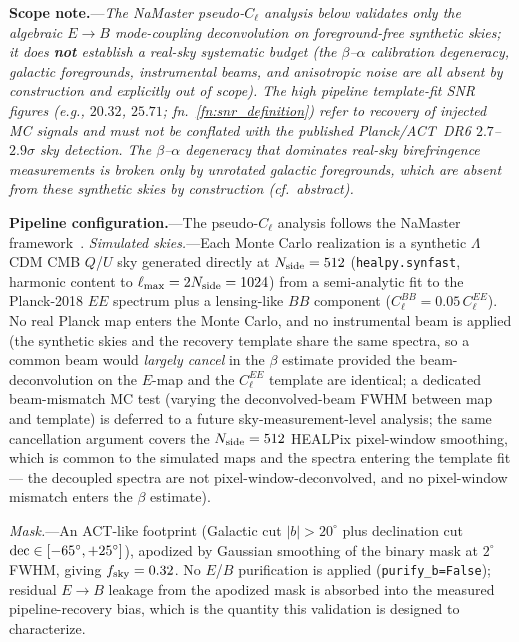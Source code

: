 \documentclass[aps,prd,twocolumn,superscriptaddress,showpacs,preprintnumbers,nofootinbib,longbibliography,floatfix]{revtex4-2}
\begin{document}
\noindent\textbf{Scope note.}---\emph{The NaMaster pseudo-$C_\ell$ analysis
below validates only the algebraic $E\!\to\!B$ mode-coupling deconvolution on
foreground-free synthetic skies; it does \textbf{not} establish a real-sky
systematic budget (the $\beta$--$\alpha$ calibration degeneracy, galactic
foregrounds, instrumental beams, and anisotropic noise are all absent by
construction and explicitly out of scope).
The high pipeline template-fit SNR figures
(e.g., $20.32$, $25.71$; fn.~\ref{fn:snr_definition}) refer to recovery of
injected MC signals and
\emph{must not} be conflated with the published Planck/ACT~DR6 $2.7$--$2.9\sigma$
sky detection. The $\beta$--$\alpha$ degeneracy that dominates real-sky
birefringence measurements is broken only by unrotated galactic foregrounds,
which are absent from these synthetic skies by construction (cf.\ abstract).}

\noindent\textbf{Pipeline configuration.}---The pseudo-$C_\ell$ analysis follows the NaMaster framework~\cite{Alonso2019}.
\emph{Simulated skies.}---Each Monte Carlo realization is a synthetic
$\Lambda$CDM CMB $Q$/$U$ sky generated directly at $N_{\rm side}=512$
(\texttt{healpy.synfast}, harmonic content to
$\ell_{\rm max}=2N_{\rm side}=1024$) from a semi-analytic fit to the
Planck-2018 $EE$ spectrum plus a lensing-like $BB$ component
($C_\ell^{BB} = 0.05\,C_\ell^{EE}$). No real Planck map enters the
Monte Carlo, and no instrumental beam is applied (the synthetic skies and
the recovery template share the same spectra, so a common beam would
\emph{largely cancel} in the $\beta$ estimate provided the beam-deconvolution
on the $E$-map and the $C_\ell^{EE}$ template are identical; a dedicated
beam-mismatch MC test (varying the deconvolved-beam FWHM between map and
template) is deferred to a future sky-measurement-level analysis;
the same cancellation argument covers the
$N_{\rm side}=512$ HEALPix pixel-window smoothing, which is common to the
simulated maps and the spectra entering the template fit --- the decoupled
spectra are not pixel-window-deconvolved, and no pixel-window mismatch
enters the $\beta$ estimate).

\emph{Mask.}---An ACT-like footprint (Galactic cut $|b|>20^\circ$ plus
declination cut ${\rm dec}\in[-65^\circ, +25^\circ]$), apodized by Gaussian
smoothing of the binary mask at $2^\circ$ FWHM, giving
$f_{\rm sky}=0.32$. No $E$/$B$ purification is applied
(\texttt{purify\_b=False}); residual $E\!\to\!B$ leakage from the apodized
mask is absorbed into the measured pipeline-recovery bias, which is the
quantity this validation is designed to characterize.
\end{document}
